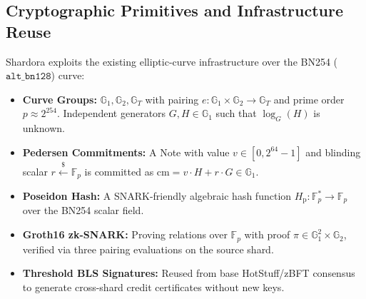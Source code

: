 \documentclass[sigconf,nonacm]{acmart}
\begin{document}
\subsection{Cryptographic Primitives and Infrastructure Reuse}
Shardora exploits the existing elliptic-curve infrastructure over the BN254 ($\mathtt{alt\_bn128}$) curve:
\begin{itemize}
    \item \textbf{Curve Groups:} $\mathbb{G}_1, \mathbb{G}_2, \mathbb{G}_T$ with pairing $e: \mathbb{G}_1 \times \mathbb{G}_2 \to \mathbb{G}_T$ and prime order $p \approx 2^{254}$. Independent generators $G, H \in \mathbb{G}_1$ such that $\log_G(H)$ is unknown.
    \item \textbf{Pedersen Commitments:} A Note with value $v \in [0, 2^{64}-1]$ and blinding scalar $r \xleftarrow{\$} \mathbb{F}_p$ is committed as $\text{cm} = v \cdot H + r \cdot G \in \mathbb{G}_1$.
    \item \textbf{Poseidon Hash:} A SNARK-friendly algebraic hash function $H_{\text{p}}: \mathbb{F}_p^* \to \mathbb{F}_p$ over the BN254 scalar field.
    \item \textbf{Groth16 zk-SNARK:} Proving relations over $\mathbb{F}_p$ with proof $\pi \in \mathbb{G}_1^2 \times \mathbb{G}_2$, verified via three pairing evaluations on the source shard.
    \item \textbf{Threshold BLS Signatures:} Reused from base HotStuff/zBFT consensus to generate cross-shard credit certificates without new keys.
\end{itemize}
\end{document}
